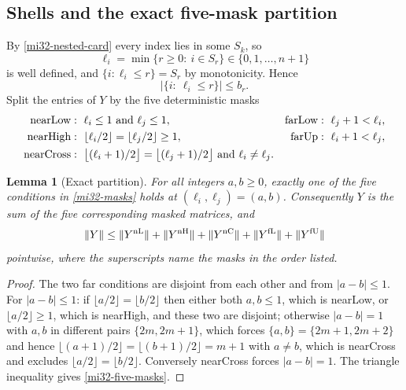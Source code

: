 \documentclass[11pt]{article}
\newtheorem{lemma}[theorem]{Lemma}
\theoremstyle{definition}
\theoremstyle{remark}
\newcommand{\norm}[1]{\lVert#1\rVert}
\begin{document}
\subsection{Shells and the exact five-mask partition}
\label{mi32-shells}

By \eqref{mi32-nested-card} every index lies in some $S_k$, so
\begin{equation}\label{mi32-level-def}
 \ell_i=\min\{r\ge0:\ i\in S_r\}\in\{0,1,\ldots,n+1\}
\end{equation}
is well defined, and $\{i:\ell_i\le r\}=S_r$ by monotonicity. Hence
\begin{equation}\label{mi32-level-card}
 \bigl|\{i:\ \ell_i\le r\}\bigr|\le b_r .
\end{equation}
Split the entries of $Y$ by the five deterministic masks
\begin{equation}\label{mi32-masks}
 \begin{aligned}
 \text{\rm nearLow}&:\ \ell_i\le1\ \text{and}\ \ell_j\le1, &
 \text{\rm farLow}&:\ \ell_j+1<\ell_i,\\
 \text{\rm nearHigh}&:\ \lfloor\ell_i/2\rfloor
     =\lfloor\ell_j/2\rfloor\ge1, &
 \text{\rm farUp}&:\ \ell_i+1<\ell_j,\\
 \text{\rm nearCross}&:\ \bigl\lfloor(\ell_i+1)/2\bigr\rfloor
     =\bigl\lfloor(\ell_j+1)/2\bigr\rfloor
        \ \text{and}\ \ell_i\ne\ell_j. &&
 \end{aligned}
\end{equation}

\begin{lemma}[Exact partition]
\label{mi32-partition-lemma}
For all integers $a,b\ge0$, exactly one of the five conditions in
\eqref{mi32-masks} holds at $(\ell_i,\ell_j)=(a,b)$. Consequently
$Y$ is the sum of the five corresponding masked matrices, and
\begin{equation}\label{mi32-five-masks}
 \norm{Y}\le\norm{Y^{\rm nL}}+\norm{Y^{\rm nH}}
          +\norm{Y^{\rm nC}}+\norm{Y^{\rm fL}}+\norm{Y^{\rm fU}}
\end{equation}
pointwise, where the superscripts name the masks in the order listed.
\end{lemma}
\begin{proof}
The two far conditions are disjoint from each other and from
$|a-b|\le1$. For $|a-b|\le1$: if $\lfloor a/2\rfloor=\lfloor
b/2\rfloor$ then either both $a,b\le1$, which is nearLow, or
$\lfloor a/2\rfloor\ge1$, which is nearHigh, and these two are
disjoint; otherwise $|a-b|=1$ with $a,b$ in different pairs
$\{2m,2m+1\}$, which forces $\{a,b\}=\{2m+1,2m+2\}$ and hence
$\lfloor(a+1)/2\rfloor=\lfloor(b+1)/2\rfloor=m+1$ with $a\ne b$, which
is nearCross and excludes $\lfloor a/2\rfloor=\lfloor b/2\rfloor$.
Conversely nearCross forces $|a-b|=1$. The triangle inequality gives
\eqref{mi32-five-masks}.
\end{proof}
\end{document}
